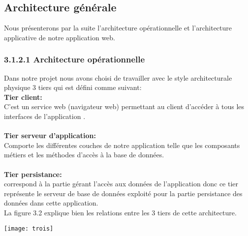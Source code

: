 \documentclass[a4paper,12pt,oneside]{report}
\begin{document}
\subsection{Architecture générale}
Nous présenterons par la suite l'architecture
opérationnelle et l'architecture applicative de notre application web.
\subsubsection{3.1.2.1 Architecture opérationnelle}
Dans notre projet nous avons choisi de travailler avec le style architecturale physique 3 tiers qui est défini comme suivant: \\
  \textbf{Tier client:} \\
C'est un service web (navigateur web) permettant au client d'accéder à tous les interfaces de l'application .\\
\\
 \textbf{Tier serveur d'application:}\\
Comporte  les différentes couches de notre application telle que les composants métiers et les méthodes d'accès à la base de données.\\
\\
 \textbf{Tier persistance:} \\
correspond à la partie gérant l'accès aux données de l'application donc ce tier représente le serveur de base de données exploité pour la partie persistance des données dans cette application.\\
La figure 3.2 explique bien les relations entre les 3 tiers de cette architecture.


\begin{center}
\texttt{[image: trois]}

\label{fig1}
\end{center} 	
 
\end{document}
